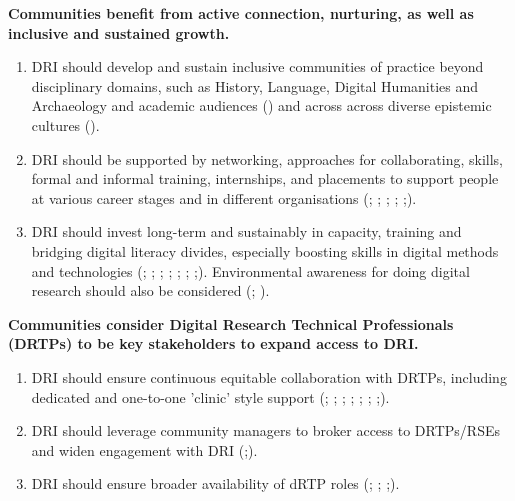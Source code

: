 \documentclass[11pt]{scrartcl}
\begin{document}
\noindent\textbf{Communities benefit from active connection, nurturing, as well as inclusive and sustained growth.}  

\begin{enumerate}[resume]
\item DRI should develop and sustain inclusive communities of practice beyond disciplinary domains, such as History, Language, Digital Humanities and Archaeology and academic audiences (\cite[10,26]{taylor_2022_10518740,beavan_2025a_15083396}) and across across diverse epistemic cultures (\cite{duran_del_fierro_2025_17641455}).   

\item DRI should be supported by networking, approaches for collaborating, skills, formal and informal training, internships, and placements to support people at various career stages and in different organisations 
(\cite[17,72]{de_roure_2022_4716148}; \cite[2]{bell_2025_17099176}; \cite[20,21]{romanova_2021_5105938}; \cite[34,35]{shoaib_sufi_2023_7686348}; \cite[47]{taylor_2022_10518740};\cite{beavan_2025a_15083396}).   

\item DRI should invest long-term and sustainably in capacity, training and bridging digital literacy divides, especially boosting skills in digital methods and technologies 
(\cite[4,11]{de_roure_2022_4716148}; \cite[10]{Black19102024}; \cite[22]{collier25}; \cite[6]{evans23}; \cite[73]{shoaib_sufi_2023_7686348}; \cite[12,27]{sichani_2023_8177926}; \cite[7]{hawkins_2024_14006955};\cite{beavan_2025a_15083396}). 
Environmental awareness for doing digital research should also be considered 
(\cite[28]{sichani_2023_8177926}; \cite[6]{evans23}).  
\end{enumerate}

\noindent\textbf{Communities consider Digital Research Technical Professionals (DRTPs) to be key stakeholders to expand access to DRI.}  

\begin{enumerate}[resume]
\item DRI should ensure continuous equitable collaboration with DRTPs, including dedicated and one-to-one 'clinic' style support 
(\cite[48]{de_roure_2022_4716148}; \cite[8]{bell_2025_17099176}; \cite[10]{Black19102024}; \cite[17]{romanova_2021_5105938}; \cite[12]{sichani_2023_8177926}; \cite[33]{taylor_2022_10518740}; \cite[1,2]{hawkins_2024_14006955};\cite{beavan_2025a_15083396}).

\item DRI should leverage community managers to broker access to DRTPs/RSEs and widen engagement with DRI 
(\cite[10]{bell_2025_17099176};\cite{beavan_2025a_15083396}).

\item DRI should ensure broader availability of dRTP roles 
(\cite[2]{bell_2025_17099176}; \cite[48,73]{shoaib_sufi_2023_7686348}; \cite[10]{sichani_2023_8177926};\cite{beavan_2025a_15083396}).  
\end{enumerate}
\end{document}
